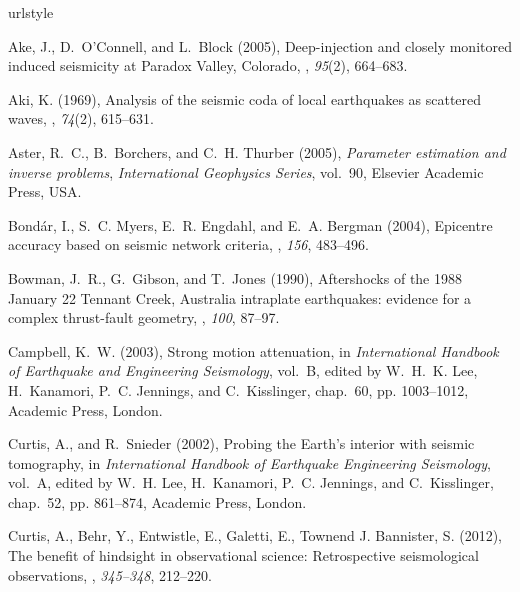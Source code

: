 \documentclass[12pt,double]{article}
\begin{document}
\begin{thebibliography}{45}
\providecommand{\natexlab}[1]{#1}
\expandafter\ifx\csname urlstyle\endcsname\relax
  \providecommand{\doi}[1]{doi:\discretionary{}{}{}#1}\else
  \providecommand{\doi}{doi:\discretionary{}{}{}\begingroup
  \urlstyle{rm}\Url}\fi

Ake, J., D.~O'{C}onnell, and L.~Block (2005), Deep-injection and closely
  monitored induced seismicity at {P}aradox {V}alley, {C}olorado,
  \bssa, \textit{95}(2),
  664--683.

Aki, K. (1969), Analysis of the seismic coda of local earthquakes as scattered
  waves, \jgr, \textit{74}(2), 615--631.

Aster, R.~C., B.~Borchers, and C.~H. Thurber (2005), \textit{Parameter
  estimation and inverse problems}, \textit{International Geophysics Series},
  vol.~90, Elsevier Academic Press, USA.

Bond\'ar, I., S.~C. Myers, E.~R. Engdahl, and E.~A. Bergman (2004), Epicentre
  accuracy based on seismic network criteria, \gji, \textit{156}, 483--496.

Bowman, J.~R., G.~Gibson, and T.~Jones (1990), Aftershocks of the 1988
  {J}anuary 22 {T}ennant {C}reek, {A}ustralia intraplate earthquakes: evidence
  for a complex thrust-fault geometry, \gji, \textit{100}, 87--97.

Campbell, K.~W. (2003), Strong motion attenuation, in \textit{International
  Handbook of Earthquake and Engineering Seismology}, vol.~B, edited by
  W.~H.~K. Lee, H.~Kanamori, P.~C. Jennings, and C.~Kisslinger, chap.~60, pp.
  1003--1012, Academic Press, London.

Curtis, A., and R.~Snieder (2002), Probing the {E}arth's interior with seismic
  tomography, in \textit{International Handbook of Earthquake Engineering
  Seismology}, vol.~{A}, edited by W.~H. Lee, H.~Kanamori, P.~C. Jennings, and
  C.~Kisslinger, chap.~52, pp. 861--874, Academic Press, London.

Curtis, A., Behr, Y., Entwistle, E., Galetti, E., Townend J. Bannister, S. (2012),
The benefit of hindsight in observational science: {R}etrospective
seismological observations, \epsl, \textit{345--348}, 212--220.


\end{thebibliography}
\end{document}
